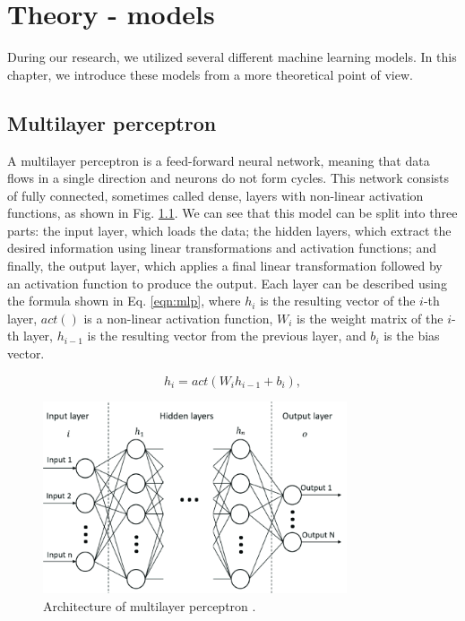 
\chapter{Theory - models}
\label{chap:thoery}

During our research, we utilized several different machine learning models. In this chapter, we introduce these models from a more theoretical point of view.

\section{Multilayer perceptron}
\label{MLP}

A multilayer perceptron is a feed-forward neural network, meaning that data flows in a single direction and neurons do not form cycles. This network consists of fully connected, sometimes called dense, layers with non-linear activation functions, as shown in Fig. \ref{fig:mlp}. We can see that this model can be split into three parts: the input layer, which loads the data; the hidden layers, which extract the desired information using linear transformations and activation functions; and finally, the output layer, which applies a final linear transformation followed by an activation function to produce the output. Each layer can be described using the formula shown in Eq. \ref{eqn:mlp}, where $h_i$ is the resulting vector of the $i$-th layer, $act()$ is a non-linear activation function, $W_i$ is the weight matrix of the $i$-th layer, $h_{i-1}$ is the resulting vector from the previous layer, and $b_i$ is the bias vector.

\begin{equation}
	\label{eqn:mlp}
	h_i = act(W_i h_{i-1} + b_i),
\end{equation}

\begin{figure}[!h]
	\centering
	
	\includegraphics[width=0.8\textwidth]{images/MLP_arch.png}
	
	\caption{Architecture of multilayer perceptron \cite{MLParch}.}
	\label{fig:mlp}
\end{figure} 

